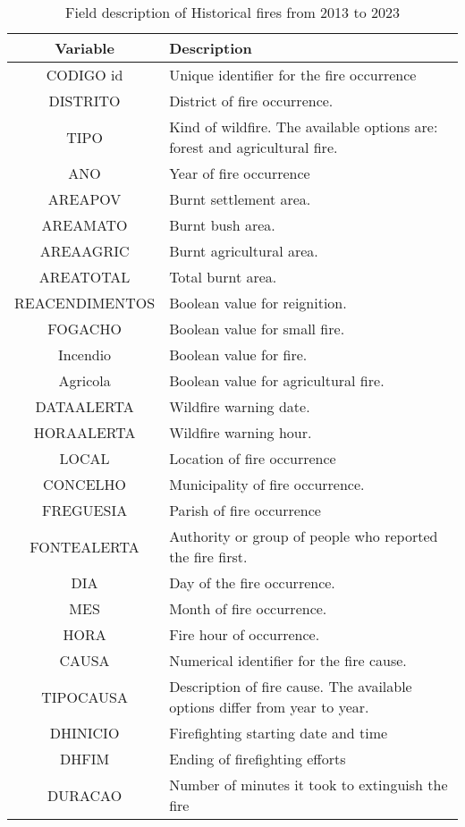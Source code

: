 \begin{table}[H]
	\caption{Field description of Historical fires from 2013 to 2023 \cite{icnf2024}}
	\label{historical_occurrences_2013_2023}
	\centering
	\small
	\begin{tabular}{cp{8.5cm}}
		\hline
		\textbf{Variable} & \textbf{Description}\\
		\hline
		CODIGO id  & Unique identifier for the fire occurrence \\
		DISTRITO  & District of fire occurrence. \\
		TIPO  & Kind of wildfire. The available options are: forest and agricultural fire.\\
		ANO  & Year of fire occurrence \\
		AREAPOV & Burnt settlement area. \\
		AREAMATO & Burnt bush area.  \\
		AREAAGRIC & Burnt agricultural area. \\
		AREATOTAL & Total burnt area. \\
		REACENDIMENTOS & Boolean value for reignition. \\
		FOGACHO & Boolean value for small fire. \\
		Incendio & Boolean value for fire. \\
		Agricola & Boolean value for agricultural fire. \\
		DATAALERTA & Wildfire warning date. \\
		HORAALERTA & Wildfire warning hour. \\
		LOCAL & Location of fire occurrence \\
		CONCELHO & Municipality of fire occurrence. \\
		FREGUESIA & Parish of fire occurrence\\
		FONTEALERTA & Authority or group of people who reported the fire first. \\
		DIA & Day of the fire occurrence. \\
		MES & Month of fire occurrence. \\
		HORA & Fire hour of occurrence. \\
		CAUSA & Numerical identifier for the fire cause. \\
		TIPOCAUSA & Description of fire cause. The available options differ from year to year. \\
		DHINICIO & Firefighting starting date and time \\
		DHFIM & Ending of firefighting efforts\\
		DURACAO & Number of minutes it took to extinguish the fire \\

\end{tabular}
\end{table}
